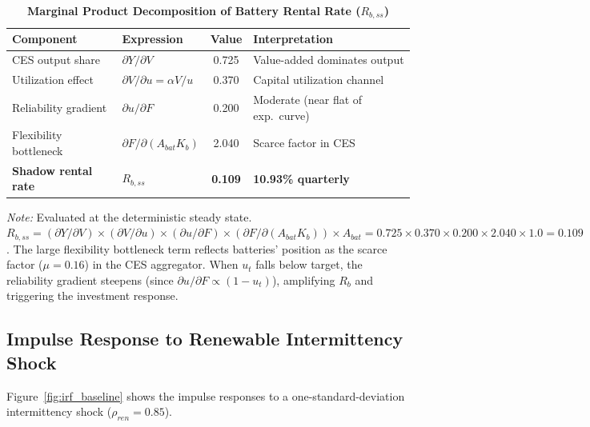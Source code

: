 	\begin{table}[H]
		\centering
		\caption[Marginal Product Decomposition of Battery Rental Rate]{\textbf{Marginal Product Decomposition of Battery Rental Rate ($R_{b,ss}$)}}
		\label{tab:mpk_decomp}
		\renewcommand{\arraystretch}{1.3}
		\small
		\begin{tabular}{l l c l}
			\toprule
			\textbf{Component} & \textbf{Expression} & \textbf{Value} & \textbf{Interpretation} \\
			\midrule
			CES output share & $\partial Y / \partial V$ & 0.725 & Value-added dominates output \\
			Utilization effect & $\partial V / \partial u = \alpha V/u$ & 0.370 & Capital utilization channel \\
			Reliability gradient & $\partial u / \partial F$ & 0.200 & Moderate (near flat of exp.\ curve) \\
			Flexibility bottleneck & $\partial F / \partial (A_{bat} K_b)$ & 2.040 & Scarce factor in CES \\
			\midrule
			\textbf{Shadow rental rate} & $R_{b,ss}$ & \textbf{0.109} & \textbf{10.93\% quarterly} \\
			\bottomrule
		\end{tabular}
		\vspace{0.2cm}
		\parbox{\textwidth}{\footnotesize \textit{Note:} Evaluated at the deterministic steady state. $R_{b,ss} = (\partial Y/\partial V) \times (\partial V/\partial u) \times (\partial u/\partial F) \times (\partial F/\partial(A_{bat} K_b)) \times A_{bat} = 0.725 \times 0.370 \times 0.200 \times 2.040 \times 1.0 = 0.109$. The large flexibility bottleneck term reflects batteries' position as the scarce factor ($\mu = 0.16$) in the CES aggregator. When $u_t$ falls below target, the reliability gradient steepens (since $\partial u/\partial F \propto (1-u_t)$), amplifying $R_b$ and triggering the investment response.}
	\end{table}

	\subsection{Impulse Response to Renewable Intermittency Shock}
	
	Figure~\ref{fig:irf_baseline} shows the impulse responses to a one-standard-deviation intermittency shock ($\rho_{ren}=0.85$).
	
